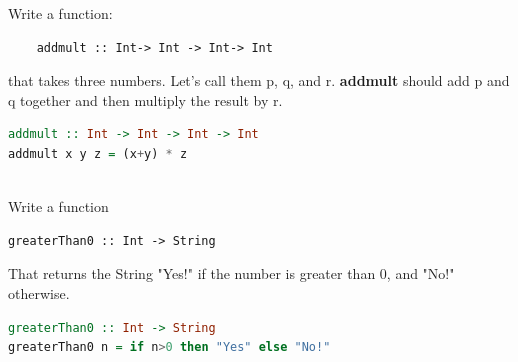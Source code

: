 \documentclass{article}
\begin{document}
\begin{Exercise}
  Write a function:
  \begin{lstlisting}
    addmult :: Int-> Int -> Int-> Int
  \end{lstlisting}   
  that takes three numbers. Let’s call them p, q, and r. \textbf{addmult}  should add p and q together and then multiply the result by r.
\end{Exercise}

\begin{Answer}

\begin{lstlisting}[language=Haskell]
addmult :: Int -> Int -> Int -> Int
addmult x y z = (x+y) * z
  
\end{lstlisting}
  \end{Answer}

\vspace{1cm}
\pagebreak
{}
\begin{Exercise}
Write a function 
\begin{lstlisting}
greaterThan0 :: Int -> String
\end{lstlisting}   
That returns the String "Yes!" if the number is greater than 0, and "No!" otherwise. 
\end{Exercise}
\begin{Answer}
  \begin{lstlisting}[language=Haskell]
greaterThan0 :: Int -> String
greaterThan0 n = if n>0 then "Yes" else "No!"
    
  \end{lstlisting}
  \end{Answer}

\end{document}
